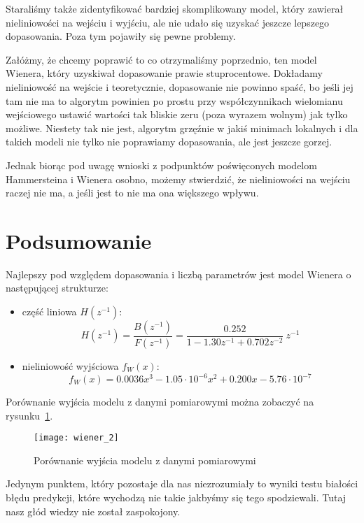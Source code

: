 \documentclass[11pt, a4paper]{article}
\begin{document}
Staraliśmy także zidentyfikować bardziej skomplikowany model, który zawierał nieliniowości na wejściu i wyjściu, ale nie udało się uzyskać jeszcze lepszego dopasowania. Poza tym pojawiły się pewne problemy.

Załóżmy, że chcemy poprawić to co otrzymaliśmy poprzednio, ten model Wienera, który uzyskiwał dopasowanie prawie stuprocentowe. Dokładamy nieliniowość na wejście i teoretycznie, dopasowanie nie powinno spaść, bo jeśli jej tam nie ma to algorytm powinien po prostu przy współczynnikach wielomianu wejściowego ustawić wartości tak bliskie zeru (poza wyrazem wolnym) jak tylko możliwe. Niestety tak nie jest, algorytm grzęźnie w jakiś minimach lokalnych i dla takich modeli nie tylko nie poprawiamy dopasowania, ale jest jeszcze gorzej.

Jednak biorąc pod uwagę wnioski z podpunktów poświęconych modelom Hammersteina i Wienera osobno, możemy stwierdzić, że nieliniowości na wejściu raczej nie ma, a jeśli jest to nie ma ona większego wpływu.

\section{Podsumowanie}

Najlepszy pod względem dopasowania i liczbą parametrów jest model Wienera o następującej strukturze:
\begin{itemize}
\item część liniowa $H(z^{-1})$:
\[
	H(z^{-1}) = \frac{B(z^{-1})}{F(z^{-1})} =
		\frac{0.252}{1 - 1.30 z^{-1} + 0.702 z^{-2}} \ z^{-1}
\]
\item nieliniowość wyjściowa $f_W(x)$:
\[
	f_W(x) = 0.0036x^3 -1.05 \cdot 10^{-6} x^2 + 0.200 x - 5.76 \cdot 10^{-7}
\]
\end{itemize}

Porównanie wyjścia modelu z danymi pomiarowymi można zobaczyć na rysunku~\ref{fig:compare}.
\begin{figure}[htbp!]
	\centering
	\texttt{[image: wiener\_2]}
	\caption{Porównanie wyjścia modelu z danymi pomiarowymi}
	\label{fig:compare}
\end{figure}

Jedynym punktem, który pozostaje dla nas niezrozumiały to wyniki testu białości błędu predykcji, które wychodzą nie takie jakbyśmy się tego spodziewali. Tutaj nasz głód wiedzy nie został zaspokojony.
\end{document}
